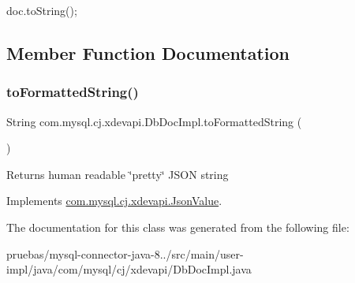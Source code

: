 \begin{DoxyPre}doc.toString();
\end{DoxyPre}
 

\subsection{Member Function Documentation}
\mbox{\label{classcom_1_1mysql_1_1cj_1_1xdevapi_1_1_db_doc_impl_a4880b999d135b6a871d605b523fc1529}} 
\subsubsection{\texorpdfstring{to\+Formatted\+String()}{toFormattedString()}}
{\footnotesize\ttfamily String com.\+mysql.\+cj.\+xdevapi.\+Db\+Doc\+Impl.\+to\+Formatted\+String (\begin{DoxyParamCaption}{ }\end{DoxyParamCaption})}

\begin{DoxyReturn}{Returns}
human readable \char`\"{}pretty\char`\"{} J\+S\+ON string 
\end{DoxyReturn}


Implements \mbox{\hyperlink{interfacecom_1_1mysql_1_1cj_1_1xdevapi_1_1_json_value_aed42bf9ff63b3cd329cb1fabcf9dfe41}{com.\+mysql.\+cj.\+xdevapi.\+Json\+Value}}.



The documentation for this class was generated from the following file\+:\begin{DoxyCompactItemize}
\item 
pruebas/mysql-\/connector-\/java-\/8../src/main/user-\/impl/java/com/mysql/cj/xdevapi/Db\+Doc\+Impl.\+java\end{DoxyCompactItemize}
